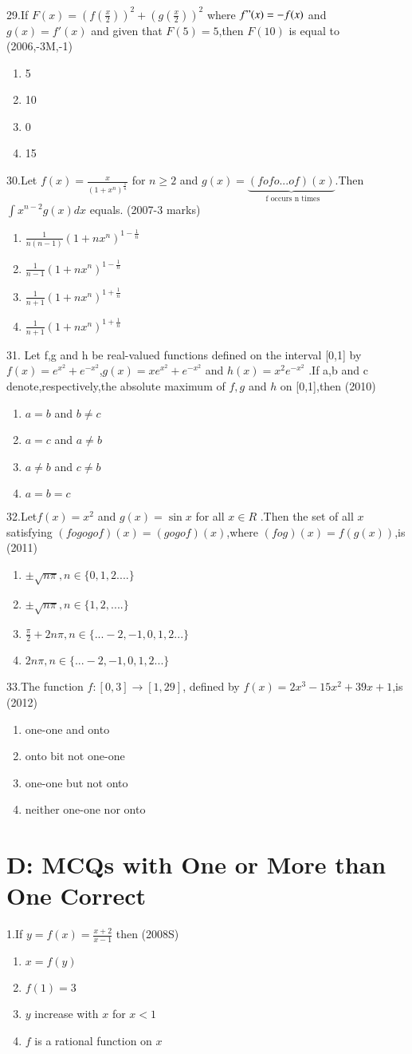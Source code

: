 \documentclass[journal,12pt,twocolumn]{IEEEtran}
\theoremstyle{remark}
\begin{document}
29.If $F(x)=\left( f\left( \frac{x}{2}\right) \right)^2 + \left(g\left (\frac{x}{2}\right) \right)^2$ where $f"(x)=-f(x)$ and $ g(x)=f'(x)$ and given that $F(5)=5$,then $F(10)$ is equal to 
\hfill(2006,-3M,-1)
\begin{enumerate}
    \item 5
    \item 10
    \item 0
    \item 15
\end{enumerate}
30.Let $f(x)=\frac{x}{(1+x^n)^\frac{1}{n}}$ for $ n\geq2$ and $g(x)= \underbrace {(fofo...of)(x)}_{\text{ f occurs n times}}$.Then $\int x^{n-2} g(x)dx$ equals.
\hfill(2007-3 marks)\\
\begin{enumerate}
    \item$ \frac{1}{n(n-1)} (1+nx^n)^{1-\frac{1}{n}} $
    \item$ \frac{1}{n-1} (1+nx^n)^{1-\frac{1}{n}} $
    \item$ \frac{1}{n+1} (1+nx^n)^{1+\frac{1}{n}} $
    \item$ \frac{1}{n+1} (1+nx^n)^{1+\frac{1}{n}} $
\end{enumerate}
31. Let f,g and h be real-valued functions defined on the interval [0,1] by $f(x)= e^{x^2} + e^{-x^2}$,$g(x)=xe^{x^2}+ e^{-x^2}$ and $h(x)=x^2e^{-x^2}$ .If a,b and c denote,respectively,the absolute maximum of $f,g$ and $h$ on [0,1],then 
\hfill(2010)
\begin{enumerate}
    \item $a=b$ and $b\neq c$
    \item $a=c$ and $a\neq b$
    \item $a\neq b$ and $c \neq b$
    \item $a=b=c$
\end{enumerate}
32.Let$f(x)=x^2$ and $g(x)=\sin x$ for all $x\in R$ .Then the set of all $x$ satisfying $(fogogof)(x)=(gogof)(x)$,where $(fog)(x)=f(g(x))$,is
\hfill(2011)
\begin{enumerate}
    \item $ \pm \sqrt{n\pi},n\in \{0,1,2....\}$
    \item $ \pm \sqrt{n\pi},n\in \{1,2,....\}$
    \item $ \frac{\pi}{2}+2n\pi,n \in\{...-2,-1,0,1,2...\} $
    \item $ 2n\pi,n\in \{...-2,-1,0,1,2...\}$
\end{enumerate}
33.The function $ f:[0,3] \rightarrow [1,29] $, defined by $ f(x)=2x^3-15x^2+39x+1 $,is 
\hfill(2012)
\begin{enumerate}
    \item one-one and onto 
    \item onto bit not one-one 
    \item one-one but not onto
    \item neither one-one nor onto
\end{enumerate}
\section {D: MCQs with One or More than One Correct}
1.If $y=f(x)=\frac{x+2}{x-1}$ then
\hfill(2008S)
\begin{enumerate}
    \item $x=f(y)$
    \item $f(1)=3$
    \item $y$ increase with $x$ for $x<1$
    \item $f$ is a rational function on $x$
\end{enumerate}
\end{document}

